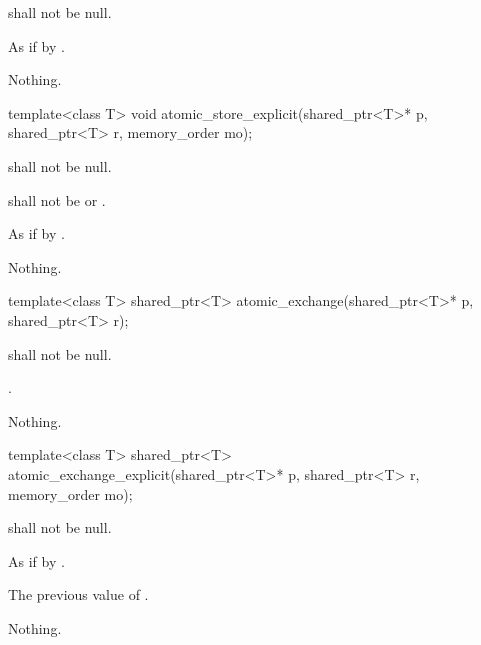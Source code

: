 \begin{itemdescr}
\pnum
\requires {} shall not be null.

\pnum
\effects As if by .

\pnum
\throws Nothing.
\end{itemdescr}

%
\begin{itemdecl}
template<class T> void atomic_store_explicit(shared_ptr<T>* p, shared_ptr<T> r, memory_order mo);
\end{itemdecl}

\begin{itemdescr}
\pnum
\requires {} shall not be null.

\pnum
\requires {} shall not be  or .

\pnum
\effects As if by .

\pnum
\throws Nothing.
\end{itemdescr}

%
\begin{itemdecl}
template<class T> shared_ptr<T> atomic_exchange(shared_ptr<T>* p, shared_ptr<T> r);
\end{itemdecl}

\begin{itemdescr}
\pnum
\requires {} shall not be null.

\pnum
\returns {}.

\pnum
\throws Nothing.
\end{itemdescr}

%
\begin{itemdecl}
template<class T>
  shared_ptr<T> atomic_exchange_explicit(shared_ptr<T>* p, shared_ptr<T> r, memory_order mo);
\end{itemdecl}

\begin{itemdescr}
\pnum
\requires {} shall not be null.

\pnum
\effects As if by .

\pnum
\returns The previous value of .

\pnum
\throws Nothing.
\end{itemdescr}

